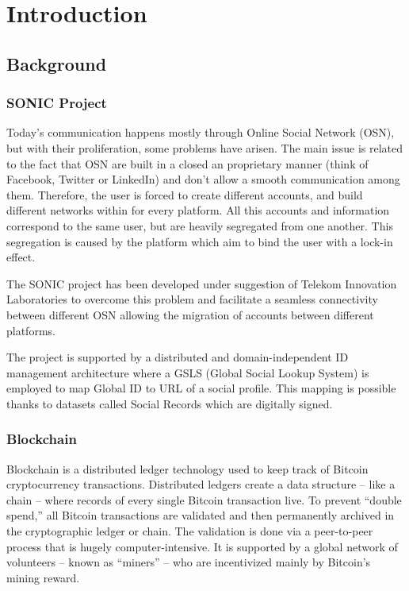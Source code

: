 \chapter{Introduction}
\label{introduction}

\section{Background}
\subsection{SONIC Project}
Today’s communication happens mostly through Online Social Network (OSN), but with their proliferation, some problems have arisen. The main issue is related to the fact that OSN are built in a closed an proprietary manner (think of Facebook, Twitter or LinkedIn) and don’t allow a smooth  communication among them. Therefore, the user is forced to create different accounts, and build different networks within for every platform. All this accounts and information correspond to the same user, but are heavily segregated from one another. This segregation is caused by the platform which aim to bind the user with a lock-in effect.

The SONIC project has been developed under suggestion of Telekom Innovation Laboratories to overcome this problem and facilitate a seamless connectivity between different OSN \citep{gondor2014sonic} allowing the migration of accounts between different platforms.

The project is supported by a distributed and domain-independent ID management architecture where a GSLS (Global Social Lookup System) is employed to map Global ID to URL of a social profile. This mapping is possible thanks to datasets called Social Records which are digitally signed.

\subsection{Blockchain}
Blockchain is a distributed ledger technology used to keep track of Bitcoin cryptocurrency transactions. Distributed ledgers create a data structure – like a chain – where records of every single Bitcoin transaction live. To prevent “double spend,” all Bitcoin transactions are validated and then permanently archived in the cryptographic ledger or chain. The validation is done via a peer-to-peer process that is hugely computer-intensive. It is supported by a global network of volunteers – known as “miners” – who are incentivized mainly by Bitcoin’s mining reward.

